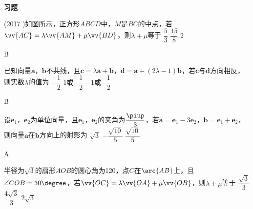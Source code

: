 \begin{exercise}{\textbf{习题}}
  \item%
    (2017 )如图所示，正方形$ABCD$中，$M$是$BC$的中点，若$\vv{AC}=\lambda\vv{AM}+\mu\vv{BD}$，则$\lambda+\mu$等于\xz
     {$\dfrac{5}3$}
     {$\dfrac{15}8$}
     {$2$}
    \begin{center}
    \end{center}
    \begin{answer}
      B
    \end{answer}
  \item%
    已知向量$\bm a$，$\bm b$不共线，且$\bm c=\lambda\bm a+\bm b$，$\bm d=\bm a+(2\lambda-1)\bm b$，若$\bm c$与$\bm d$方向相反，则实数$\lambda$的值为\xz
     {$-\dfrac12$}
     {$1$或$-\dfrac12$}
     {$-1$或$-\dfrac12$}
    \begin{answer}
      B
    \end{answer}
  \item%
    设$\bm e_1$，$\bm e_2$为单位向量，且$\bm e_1$，$\bm e_2$的夹角为$\dfrac{\piup}3$，若$\bm a=\bm e_1-3\bm e_2$，$\bm b=\bm e_1+\bm e_2$，则向量$\bm a$在$\bm b$方向上的射影为\xz
     {$\sqrt3$}
     {$-\dfrac{\sqrt{10}}5$}
     {$\dfrac{\sqrt{10}}5$}
    \begin{answer}
      A
    \end{answer}
  \item%
    半径为$\sqrt{3}$的扇形$AOB$的圆心角为120\degree，点$C$在$\arc{AB}$上，且$\angle{COB}=30\degree$，若$\vv{OC}=\lambda\vv{OA}+\mu\vv{OB}$，则$\lambda+\mu$等于\xz
     {$\dfrac{\sqrt{3}}3$}
     {$\dfrac{4\sqrt{3}}3$}
     {$2\sqrt{3}$}
    \begin{answer}

\end{answer}
\end{exercise}
